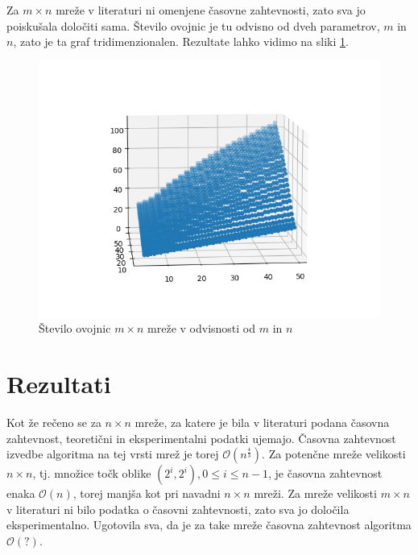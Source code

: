 \documentclass[a4paper]{article}
\begin{document}
Za $m \times n$ mreže v literaturi ni omenjene časovne zahtevnosti, zato sva jo poiskušala določiti sama. Število ovojnic je tu odvisno od dveh parametrov, $m$ in $n$, zato je ta graf 
tridimenzionalen. Rezultate lahko vidimo na sliki \ref{fig:3d}.

\begin{figure}[!h]
	\centering
	\caption{Število ovojnic $m \times n$ mreže v odvisnosti od $m$ in $n$}
	\label{fig:3d}
	\vspace{2mm}
	\includegraphics[scale=0.6]{mxn_3d.png}
\end{figure}

\section{Rezultati}
Kot že rečeno se za $n \times n$ mreže, za katere je bila v literaturi podana časovna zahtevnost, teoretični in eksperimentalni podatki ujemajo. Časovna zahtevnost izvedbe algoritma na
tej vrsti mrež je torej $\mathcal{O}(n ^ \frac{4}{3})$. Za potenčne mreže velikosti $n \times n$, tj. množice točk oblike $(2^i, 2^i), 0 \leq i \leq n - 1$, je časovna zahtevnost enaka
$\mathcal{O}(n)$, torej manjša kot pri navadni $n \times n$ mreži.
Za mreže velikosti $m \times n$ v literaturi ni bilo podatka o časovni zahtevnosti, zato sva jo določila eksperimentalno. Ugotovila sva, da je za take mreže časovna zahtevnost algoritma 
$\mathcal{O}(?)$. 
\end{document}
